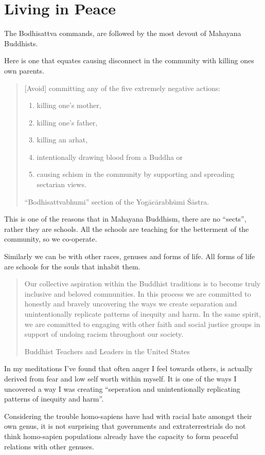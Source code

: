 
\chapter{Living in Peace}
\label{peace}

The Bodhisattva commands, are followed by the most devout of Mahayana Buddhists.

Here is one that equates causing disconnect in the community with killing ones
own parents. 
\blockquote[``Bodhisattvabhumi'' section of the Yogācārabhūmi Śāstra.]{[Avoid] 
committing any of the five extremely negative actions: 
\begin{enumerate}
  \item killing one's mother, 
  \item killing one's father, 
  \item killing an arhat, 
  \item intentionally drawing blood from a Buddha or 
  \item causing schism in the community by supporting and spreading sectarian views. 
\end{enumerate}
}

This is one of the reasons that in Mahayana Buddhism, there are no ``sects'', 
rather they are schools. All the schools are teaching for the betterment of the
community, so we co-operate. 

Similarly we can be with other races, genuses and forms of life. All forms of
life are schools for the souls that inhabit them.

\blockquote[Buddhist Teachers and Leaders in the United States\cite{racial}]{Our
 collective aspiration within the Buddhist traditions is to become truly 
inclusive and beloved communities.  In this process we are committed to 
honestly and bravely uncovering the ways we create separation and 
unintentionally replicate patterns of inequity and harm.  In the same spirit, 
we are committed to engaging with other faith and social justice groups in 
support of undoing racism throughout our society.
}

In my meditations I've found that often anger I feel towards others, is actually
derived from fear and low self worth within myself. It is one of the ways I
uncovered a way I was creating ``seperation and unintentionally replicating
patterns of inequity and harm''.

Considering the trouble homo-sapiens have had with racial hate amongst their 
own genus, it is not surprising that governments and extraterrestrials do not 
think homo-sapien populations already have the capacity to form peaceful 
relations with other genuses.

